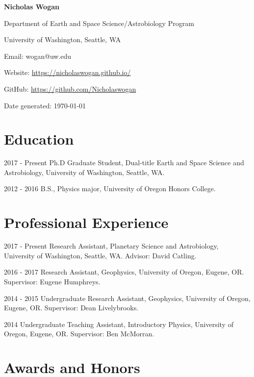 \documentclass{article}
\begin{document}
\begin{center}
\textbf{Nicholas Wogan}

Department of Earth and Space Science/Astrobiology Program

University of Washington, Seattle, WA

Email: wogan@uw.edu

Website: \url{https://nicholaswogan.github.io/}

GitHub: \url{https://github.com/Nicholaswogan}

Date generated: \today

\end{center}

\section{Education}

\begin{cvlist}
\item[2017 - Present]
  Ph.D Graduate Student, Dual-title Earth and Space Science and Astrobiology, University of Washington, Seattle, WA.
\item[2012 - 2016]
  B.S., Physics major, University of Oregon Honors College.
\end{cvlist}

\section{Professional Experience}

\begin{cvlist}
\item[2017 - Present]
  Research Assistant, Planetary Science and Astrobiology, University of Washington, Seattle, WA. Advisor: David Catling.
\item[2016 - 2017]
  Research Assistant, Geophysics, University of Oregon, Eugene, OR. Supervisor: Eugene Humphreys.
\item[2014 - 2015]
  Undergraduate Research Assistant, Geophysics, University of Oregon, Eugene, OR. Supervisor: Dean Livelybrooks.
\item[2014] 
  Undergraduate Teaching Assistant, Introductory Physics, University of Oregon, Eugene, OR. Supervisor: Ben McMorran.
\end{cvlist}

\section{Awards and Honors}
\end{document}
